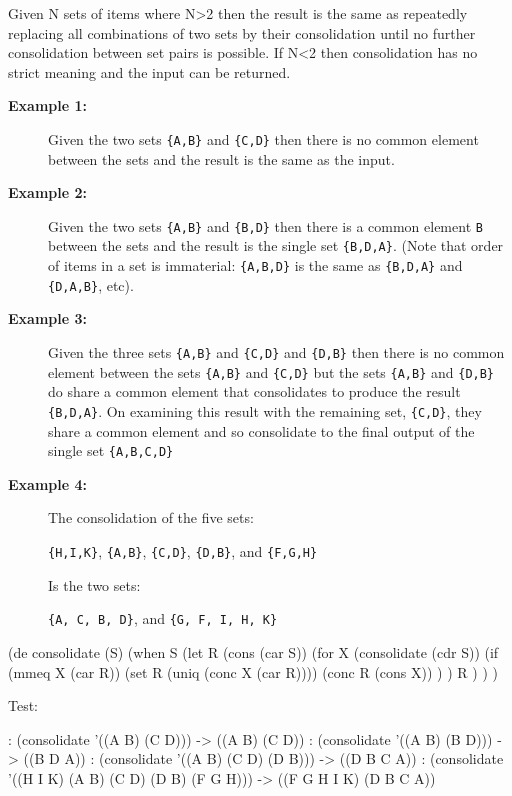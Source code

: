 Given N sets of items where N\textgreater{}2 then the result is the same
as repeatedly replacing all combinations of two sets by their
consolidation until no further consolidation between set pairs is
possible. If N\textless{}2 then consolidation has no strict meaning and
the input can be returned.

\begin{description}
\item[\textbf{Example 1:} ]
Given the two sets \texttt{\{A,B\}} and \texttt{\{C,D\}} then there is
no common element between the sets and the result is the same as the
input.
\item[\textbf{Example 2:} ]
Given the two sets \texttt{\{A,B\}} and \texttt{\{B,D\}} then there is a
common element \texttt{B} between the sets and the result is the single
set \texttt{\{B,D,A\}}. (Note that order of items in a set is
immaterial: \texttt{\{A,B,D\}} is the same as \texttt{\{B,D,A\}} and
\texttt{\{D,A,B\}}, etc).
\item[\textbf{Example 3:} ]
Given the three sets \texttt{\{A,B\}} and \texttt{\{C,D\}} and
\texttt{\{D,B\}} then there is no common element between the sets
\texttt{\{A,B\}} and \texttt{\{C,D\}} but the sets \texttt{\{A,B\}} and
\texttt{\{D,B\}} do share a common element that consolidates to produce
the result \texttt{\{B,D,A\}}. On examining this result with the
remaining set, \texttt{\{C,D\}}, they share a common element and so
consolidate to the final output of the single set \texttt{\{A,B,C,D\}}
\item[\textbf{Example 4:} ]
The consolidation of the five sets:

\texttt{\{H,I,K\}}, \texttt{\{A,B\}}, \texttt{\{C,D\}},
\texttt{\{D,B\}}, and \texttt{\{F,G,H\}}

Is the two sets:

\texttt{\{A, C, B, D\}}, and \texttt{\{G, F, I, H, K\}}

\end{description}


\begin{wideverbatim}

(de consolidate (S)
   (when S
      (let R (cons (car S))
         (for X (consolidate (cdr S))
            (if (mmeq X (car R))
               (set R (uniq (conc X (car R))))
               (conc R (cons X)) ) )
         R ) ) )

Test:

: (consolidate '((A B) (C D)))
-> ((A B) (C D))
: (consolidate '((A B) (B D)))
-> ((B D A))
: (consolidate '((A B) (C D) (D B)))
-> ((D B C A))
: (consolidate '((H I K) (A B) (C D) (D B) (F G H)))
-> ((F G H I K) (D B C A))

\end{wideverbatim}


